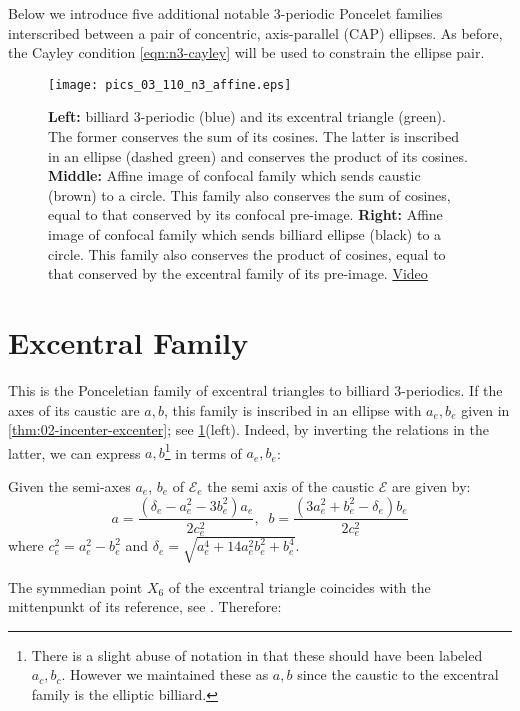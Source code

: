 Below we introduce five additional notable 3-periodic Poncelet families interscribed between a pair of concentric, axis-parallel (CAP) ellipses. As before, the Cayley condition \cref{eqn:n3-cayley} will be used to constrain the ellipse pair. 

\begin{figure}
    \centering
    \texttt{[image: pics\_03\_110\_n3\_affine.eps]}
    \caption{\textbf{Left:} billiard 3-periodic (blue) and its excentral triangle (green). The former conserves the sum of its cosines. The latter is inscribed in an ellipse (dashed green) and conserves the product of its cosines. \textbf{Middle:} Affine image of confocal family which sends caustic (brown) to a circle. This family also conserves the sum of cosines, equal to that conserved by its confocal pre-image. \textbf{Right:} Affine image of confocal family which sends billiard ellipse (black) to a circle. This family also conserves the product of cosines, equal to that conserved by the excentral family of its pre-image. \href{https://youtu.be/HjBZdrR3Azs}{Video}}
    \label{fig:03-n3-affine}
\end{figure}

\section{Excentral Family}

This is the Ponceletian family of excentral triangles to billiard 3-periodics. If the axes of its caustic are $a,b$, this family is inscribed in an ellipse with $a_e,b_e$ given in \cref{thm:02-incenter-excenter}; see \cref{fig:03-n3-affine}(left). Indeed, by inverting the relations in the latter, we can express $a,b$\footnote{There is a slight abuse of notation in that these should have been labeled $a_c,b_c$. However we maintained these as $a,b$ since the caustic to the excentral family is the elliptic billiard.} in terms of $a_e,b_e$:

\begin{proposition}
Given the semi-axes $a_e$, $b_e$ of $\mathcal{E}_e$ the semi axis of the caustic $\mathcal{E}$ are given by:
\[a=\frac{(\delta_e- a_e^2 - 3b_e^2) a_e}{2 c_e^2},\;\; b=\frac{(3a_e^2 + b_e^2 - \delta_e)b_e}{2 c_e^2}\]
where $c_e^2=a_e^2-b_e^2$ and $  \delta_e=\sqrt{a_e^4 + 14a_e^2b_e^2 + b_e^4}$.
\label{prop:03-excentral-caustic}
\end{proposition}

The symmedian point $X_6$ of the excentral triangle coincides with the mittenpunkt of its reference, see \cite[X(6)]{etc}. Therefore:

